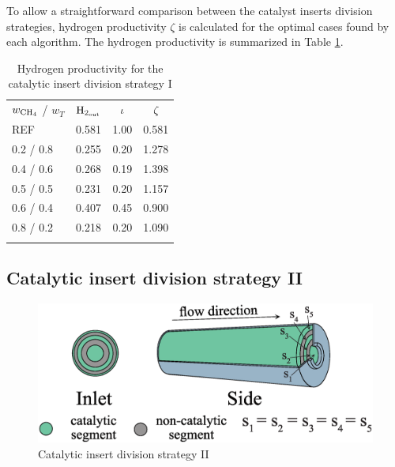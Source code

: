 \documentclass[preprint,12pt]{elsarticle}
\begin{document}


To allow a straightforward comparison between the catalyst inserts division strategies, hydrogen productivity $\zeta$ is calculated for the optimal cases found by each algorithm. The hydrogen productivity is summarized in Table \ref{tab:5RH2prod}. 

\begin{center}
\begin{table}
\centering
\caption{Hydrogen productivity for the catalytic insert division strategy I}
\label{tab:5RH2prod}
\begin{tabular}{l|c|c|c}
\hline\noalign{\smallskip}
 $w_{\rm{CH_4}}$ / $ w_T $ & $\rm{H_{2_{out}}}$ & $\iota$ & $\zeta$ \\
\noalign{\smallskip}\hline\noalign{\smallskip}
REF         & 0.581     & 1.00  &  0.581\\
0.2 / 0.8   & 0.255     & 0.20  & 1.278 \\
0.4 / 0.6   & 0.268     & 0.19  & 1.398 \\
0.5 / 0.5   & 0.231     & 0.20  & 1.157 \\
0.6 / 0.4   & 0.407     & 0.45  & 0.900 \\
0.8 / 0.2   & 0.218     & 0.20  & 1.090 \\
\noalign{\smallskip}\hline
\end{tabular}
\end{table}
\end{center}


\clearpage


\subsection{Catalytic insert division strategy II}
\label{subsec:5RE}

\begin{figure}[h!]
\centering
\includegraphics[width=120mm]{5segEqSurf.eps}
\caption{\label{fig:5segEqSurf}Catalytic insert division strategy II}
\end{figure}
\end{document}
